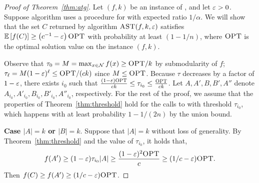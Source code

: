 
\begin{proof}[Proof of Theorem~\ref{thm:atg}]
  Let $(f,k)$ be an instance of \sm, and let $\varepsilon> 0$.
  Suppose algorithm \atg uses a procedure for \unc with
  expected ratio $1/\alpha$.
  We will show that the
  set $C$ returned by
  algorithm $\textsc{AST}(f,k,\varepsilon)$ satisfies
  $\mathbb{E} \left[ f(C) \right] \ge \left( c^{-1}-\varepsilon \right) \textsc{OPT}$
  with probability at
  least $(1 - 1/n)$, where $\textsc{OPT}$
  is the optimal solution value on the instance $(f,k)$.

  Observe that $\tau_0 = M = \max_{x \in \mathcal N} f(x) \ge \textsc{OPT} / k$ 
  by submodularity of $f$;
  $\tau_\ell = M(1 - \varepsilon)^\ell \le \textsc{OPT} / (ck)$ 
  since $M \le \textsc{OPT}$. 
  Because $\tau$ decreases by a factor of $1-\varepsilon$, 
  there exists $i_0$ such that 
  $ \frac{(1 - \varepsilon)\textsc{OPT}}{ck} \le \tau_{i_0} \le \frac{\textsc{OPT}}{ck}$.
  Let $A,A',B,B',A''$ denote 
  $A_{i_0},A'_{i_0},B_{i_0},B'_{i_0},A''_{i_0}$, respectively.
  For the rest of the proof, we assume that
  the properties of Theorem~\ref{thm:threshold} hold for the calls to \threseq
  with threshold $\tau_{i_0}$, which happens with at least
  probability $1 - 1/(2n)$ by the union bound. 
  
  \textbf{Case $|A| = k$ or $|B| = k$}.
  Suppose that $|A|=k$ without loss of generality.
  By Theorem~\ref{thm:threshold} and the value of $\tau_{i_0}$,
  it holds that,
  \begin{align*}
    f(A') \ge (1-\varepsilon) \tau_{i_0} |A| \ge 
    \frac{(1-\varepsilon)^2\textsc{OPT}}{c} \ge (1/c-\varepsilon)\textsc{OPT}.
  \end{align*}
  Then $f(C) \ge f(A') \ge (1/c - \varepsilon) \textsc{OPT}$.


\end{proof}

